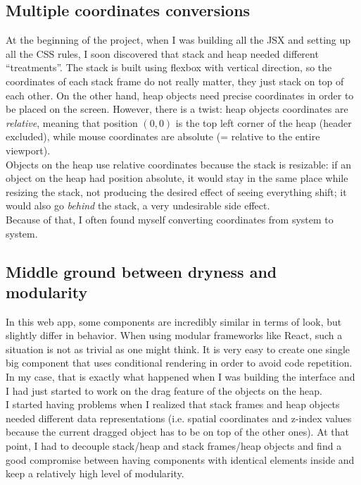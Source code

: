 \documentclass[]{usiinfbachelorproject}
\begin{document}
\subsection{Multiple coordinates conversions}

At the beginning of the project, when I was building all the JSX and setting up all the CSS rules, I soon discovered that stack and heap needed different ``treatments''. The stack is built using flexbox with vertical direction, so the coordinates of each stack frame do not really matter, they just stack on top of each other. On the other hand, heap objects need precise coordinates in order to be placed on the screen. However, there is a twist: heap objects coordinates are \emph{relative}, meaning that position ${(0,0)}$ is the top left corner of the heap (header excluded), while mouse coordinates are absolute (= relative to the entire viewport).\\
Objects on the heap use relative coordinates because the stack is resizable: if an object on the heap had position absolute, it would stay in the same place while resizing the stack, not producing the desired effect of seeing everything shift; it would also go \emph{behind} the stack, a very undesirable side effect.\\
Because of that, I often found myself converting coordinates from system to system.

\subsection{Middle ground between dryness and modularity}

In this web app, some components are incredibly similar in terms of look, but slightly differ in behavior. When using modular frameworks like React, such a situation is not as trivial as one might think. It is very easy to create one single big component that uses conditional rendering in order to avoid code repetition. In my case, that is exactly what happened when I was building the interface and I had just started to work on the drag feature of the objects on the heap.\\ I started having problems when I realized that stack frames and heap objects needed different data representations (i.e. spatial coordinates and z-index values because the current dragged object has to be on top of the other ones). At that point, I had to decouple stack/heap and stack frames/heap objects and find a good compromise between having components with identical elements inside and keep a relatively high level of modularity.
\end{document}
